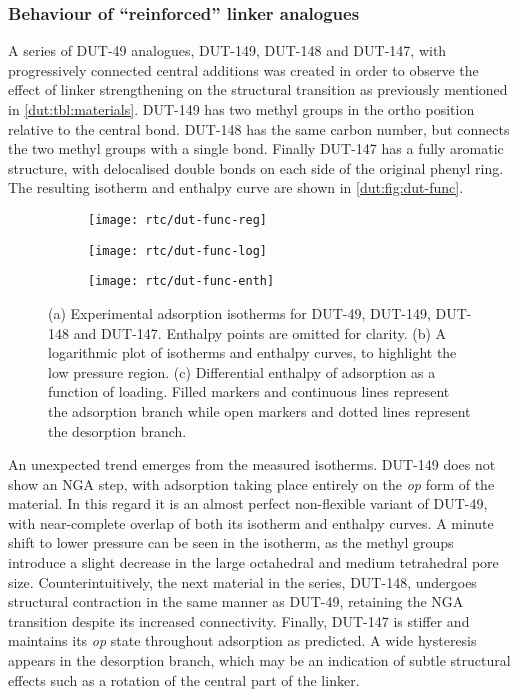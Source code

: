 \subsubsection{Behaviour of ``reinforced'' linker analogues}

A series of DUT-49 analogues, DUT-149, DUT-148 and DUT-147, 
with progressively connected central additions was created in
order to observe the effect of linker strengthening on the 
structural transition as previously mentioned in
\autoref{dut:tbl:materials}. DUT-149 has two methyl groups in the 
ortho position relative to the central bond. DUT-148 has 
the same carbon number, but connects the two methyl groups
with a single bond. Finally DUT-147 has a fully aromatic
structure, with delocalised double bonds on each side of the 
original phenyl ring. The resulting isotherm and enthalpy 
curve are shown in \autoref{dut:fig:dut-func}.

\begin{figure}[htb]
    \centering
    \begin{subfigure}{0.33\linewidth}
        \texttt{[image: rtc/dut-func-reg]}%
        \caption{}\label{dut:fig:dut-func-reg}
    \end{subfigure}%
    \begin{subfigure}{0.33\linewidth}
        \texttt{[image: rtc/dut-func-log]}%
        \caption{}\label{dut:fig:dut-func-log}
    \end{subfigure}%
    \begin{subfigure}{0.33\linewidth}
        \texttt{[image: rtc/dut-func-enth]}%
        \caption{}\label{dut:fig:dut-func-enth}
    \end{subfigure}%
    \caption{(a) Experimental adsorption isotherms for DUT-49, DUT-149,
    DUT-148 and DUT-147. Enthalpy points are omitted for clarity. 
    (b) A logarithmic plot of isotherms and enthalpy curves,
    to highlight the low pressure region. 
    (c) Differential enthalpy of adsorption as a function of loading.
    Filled markers and continuous lines represent the adsorption 
    branch while open markers and dotted lines represent the 
    desorption branch.
    }\label{dut:fig:dut-func}
\end{figure}

An unexpected trend emerges from the measured isotherms. DUT-149
does not show an \gls{NGA} step, with adsorption taking place entirely
on the \textit{op} form of the material. In this regard it is
an almost perfect non-flexible variant of DUT-49, with near-complete
overlap of both its isotherm and enthalpy curves. A minute 
shift to lower pressure can be seen in the isotherm, as the 
methyl groups introduce a slight decrease in the large octahedral
and medium tetrahedral pore size. Counterintuitively, the next material
in the series, DUT-148, undergoes structural contraction in the
same manner as DUT-49, retaining the \gls{NGA} transition despite its 
increased connectivity. Finally, DUT-147 is stiffer and maintains
its \textit{op} state throughout adsorption as predicted. A wide hysteresis
appears in the desorption branch, which may be an indication of 
subtle structural effects such as a rotation of the central part
of the linker.

